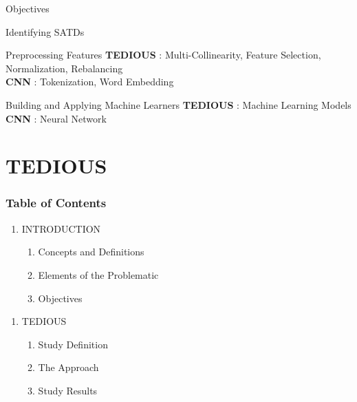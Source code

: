\documentclass{beamer}
\begin{document}
\begin{darkframes}
\begin{frame}{Objectives}
\begin{block}{\small Identifying SATDs}
					\end{block}
					\begin{block}{\small Preprocessing Features}
						\small
						\textbf{TEDIOUS} : Multi-Collinearity, Feature Selection, Normalization, Rebalancing\\
						\textbf{CNN} : Tokenization, Word Embedding
					\end{block}
					\begin{block}{\small Building and Applying Machine Learners}
						\small
						\textbf{TEDIOUS} : Machine Learning Models\\
						\textbf{CNN} : Neural Network
					\end{block}
				\end{frame}
	
			

	    \section{TEDIOUS}
	    
	    
		    \begin{frame}[allowframebreaks]
		    	\frametitle{Table of Contents}
			    	\begin{enumerate}
			    		\item \textcolor{mygray}{INTRODUCTION}
			    		\begin{enumerate}
			    			\item \textcolor{mygray}{Concepts and Definitions}
			    			\item \textcolor{mygray}{Elements of the Problematic}
			    			\item \textcolor{mygray}{Objectives}
			    		\end{enumerate}
			    	\end{enumerate}
		    		\bigskip
			    	\begin{enumerate}
			    		\item TEDIOUS
			    		\begin{enumerate}
			    			\item Study Definition
			    			\item The Approach
			    			\item Study Results
			    		\end{enumerate}
			    	\end{enumerate}
	    	\end{frame}
    	

\end{darkframes}
\end{document}
